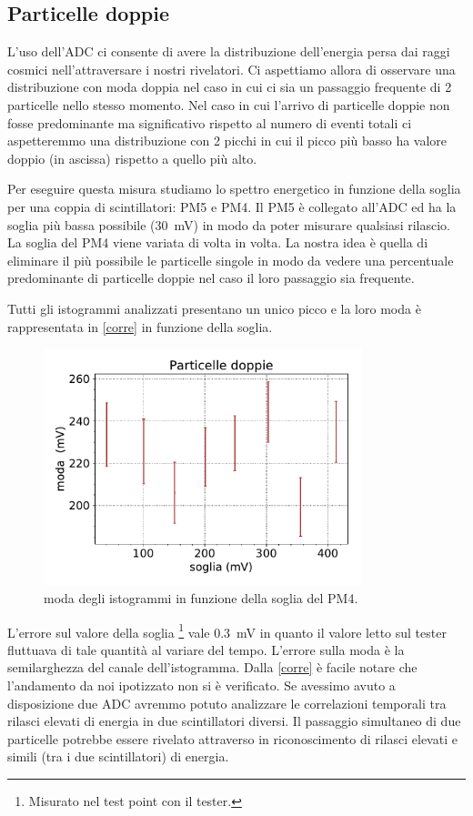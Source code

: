 \subsection{Particelle doppie}

L'uso dell'ADC ci consente di avere la distribuzione dell'energia persa dai raggi cosmici nell'attraversare i nostri rivelatori. Ci aspettiamo allora di osservare una distribuzione con moda doppia nel caso in cui ci sia un passaggio frequente di 2 particelle nello stesso momento. Nel caso in cui l'arrivo di particelle doppie non fosse predominante ma significativo rispetto al numero di eventi totali ci aspetteremmo una distribuzione con 2 picchi in cui il picco più basso ha valore doppio (in ascissa) rispetto a quello più alto.

Per eseguire questa misura studiamo lo spettro energetico in funzione della soglia per una coppia di scintillatori: PM5 e PM4. Il PM5 è collegato all'ADC ed ha la soglia più bassa possibile (\SI{30}{mV}) in modo da poter misurare qualsiasi rilascio. La soglia del PM4 viene variata di volta in volta.   La nostra idea  è quella di eliminare il più possibile le particelle singole 
in modo da vedere una percentuale predominante di particelle doppie nel caso il loro passaggio sia frequente.

Tutti gli istogrammi analizzati presentano un unico picco e la loro moda è rappresentata in \autoref{corre} in funzione della soglia.

\begin{figure}[h]
\centering
\includegraphics[width=25em]{doppie}
\caption{moda degli istogrammi in funzione della soglia del PM4.}
\label{corre}
\end{figure}

L'errore sul valore della soglia%
\footnote{Misurato nel test point con il tester.}
vale \SI{0.3}{mV} in quanto il valore letto sul tester fluttuava di tale quantità al variare del tempo. L'errore sulla moda è la semilarghezza del canale dell'istogramma.
Dalla \autoref{corre} è facile notare che l'andamento da noi ipotizzato non si è verificato. Se avessimo avuto a disposizione due ADC avremmo potuto analizzare le correlazioni temporali tra rilasci elevati di energia in due scintillatori diversi. Il passaggio simultaneo di due particelle potrebbe essere rivelato attraverso in riconoscimento  di rilasci elevati e simili (tra i due scintillatori) di energia.